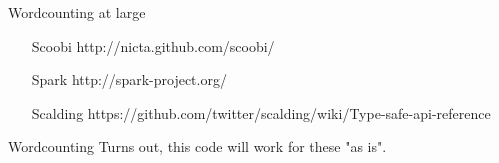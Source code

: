 \documentclass{beamer}
\begin{document}
\begin{frame}{Wordcounting at large}
\begin{enumerate}
  \item[Scoobi] http://nicta.github.com/scoobi/
  \item[Spark] http://spark-project.org/
  \item[Scalding] https://github.com/twitter/scalding/wiki/Type-safe-api-reference
\end{enumerate}
\end{frame}

\begin{frame}{Wordcounting}
  Turns out, this code will work for these "as is".
\end{frame}
\end{document}
